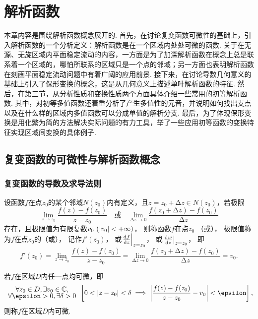 \chapter{解析函数}
本章内容是围绕解析函数概念展开的.
首先，在讨论复变函数可微性的基础上，引入解析函数的一个分析定义：解析函数是在一个区域内处处可微的函数.
关于在无源、无旋区域内平面稳定流动的内容，一方面是为了加深解析函数在概念上总是联系着一个区域的，哪怕所联系的区域只是一个点的邻域；另一方面也表明解析函数在刻画平面稳定流动问题中有着广阔的应用前景.
接下来，在讨论导数几何意义的基础上引入了保形变换的概念，这是从几何意义上描述单叶解析函数的特征.
然后，在第三节，从分析性质和变换性质两个方面具体介绍一些常用的初等解析函数.
其中，对初等多值函数还着重分析了产生多值性的元音，并说明如何找出支点以及在什么样的区域内多值函数可以分成单值的解析分支.
最后，为了体现保形变换是用化繁为简的方法解决实际问题的有力工具，举了一些应用初等函数的变换特征实现区域间变换的具体例子.

\section{复变函数的可微性与解析函数概念}
\subsection{复变函数的导数及求导法则}
\begin{definition}
设函数\(f\)在点\(z_0\)的某个邻域\(N(z_0)\)内有定义，且\(z=z_0+\increment z \in N(z_0)\)，若极限\begin{equation*}
\lim_{z \to z_0} \frac{f(z)-f(z_0)}{z-z_0}
\quad\text{或}\quad
\lim_{\increment z\to0} \frac{f(z_0+\increment z)-f(z_0)}{\increment z}
\end{equation*}存在，且极限值为有限复数\(v_0\ (\abs{v_0}<+\infty)\)，
则称函数\(f\)在点\(z_0\) （或），
极限值称为\(f\)在点\(z_0\)的（或），
记作\(f'(z_0)\)，
或\(\eval{\dv{f}{z}}_{z=z_0}\)，
或\(\eval{\dv{w}{z}}_{z=z_0}\)，
即\begin{equation}\label{equation:解析函数.导数的定义式}
	f'(z_0)
	= \lim_{z \to z_0} \frac{f(z)-f(z_0)}{z-z_0}
	= \lim_{\increment z\to0} \frac{f(z_0+\increment z)-f(z_0)}{\increment z}
	= v_0.
\end{equation}

若\(f\)在区域\(D\)内任一点均可微，即\begin{equation*}
{ \def\arraystretch{.7} \begin{array}{c}
\forall z_0 \in D, \exists v_0 \in \mathbb{C}, \\
\forall \epsilon > 0, \exists \delta > 0
\end{array} }
\left[
0 < \abs{z - z_0} < \delta
\implies
\abs{\frac{f(z) - f(z_0)}{z - z_0} - v_0} < \epsilon
\right],
\end{equation*}则称\(f\)在区域\(D\)内可微.
\end{definition}

